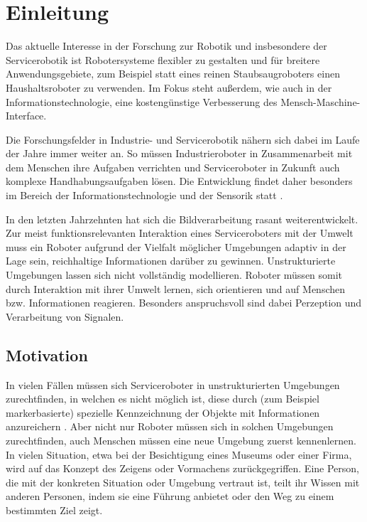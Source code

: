 
\chapter{Einleitung}
\label{einleitung_cha}
\authorsection{\editorabel}

Das aktuelle Interesse in der Forschung zur Robotik und insbesondere der Servicerobotik ist Robotersysteme flexibler zu gestalten und für breitere Anwendungsgebiete, zum Beispiel statt eines reinen Staubsaugroboters einen Haushaltsroboter zu verwenden.
Im Fokus steht außerdem, wie auch in der Informationstechnologie, eine kostengünstige Verbesserung des Mensch-Maschine-Interface\cite{kinect_1}.

Die Forschungsfelder in Industrie- und Servicerobotik nähern sich dabei im Laufe der Jahre immer weiter an.
So müssen Industrieroboter in Zusammenarbeit mit dem Menschen ihre Aufgaben verrichten und Serviceroboter in Zukunft auch komplexe Handhabungsaufgaben lösen.
Die Entwicklung findet daher besonders im Bereich der Informationstechnologie und der Sensorik statt  \cite{kinect_2}.

In den letzten Jahrzehnten hat sich die Bildverarbeitung rasant weiterentwickelt.
Zur meist funktionsrelevanten Interaktion eines Serviceroboters mit der Umwelt muss ein Roboter aufgrund der Vielfalt möglicher Umgebungen adaptiv in der Lage sein, reichhaltige Informationen darüber zu gewinnen.
Unstrukturierte Umgebungen lassen sich nicht vollständig modellieren.
Roboter müssen somit durch Interaktion mit ihrer Umwelt lernen, sich orientieren und auf Menschen bzw. Informationen reagieren.
Besonders anspruchsvoll sind dabei Perzeption und Verarbeitung von Signalen.



\authorsection{\editorjulian, \editortobias}

\section{Motivation}
\label{motivation_real_sec}


In vielen Fällen müssen sich Serviceroboter in unstrukturierten Umgebungen zurechtfinden, in welchen es nicht möglich ist, diese durch (zum Beispiel markerbasierte) spezielle Kennzeichnung der Objekte mit Informationen anzureichern \citep{sturm10rss-workshop}.
Aber nicht nur Roboter müssen sich in solchen Umgebungen zurechtfinden, auch Menschen müssen eine neue Umgebung zuerst kennenlernen.
In vielen Situation, etwa bei der Besichtigung eines Museums oder einer Firma, wird auf das Konzept des Zeigens oder Vormachens zurückgegriffen.
Eine Person, die mit der konkreten Situation oder Umgebung vertraut ist, teilt ihr Wissen mit anderen Personen, indem sie eine Führung anbietet oder den Weg zu einem bestimmten Ziel zeigt.

